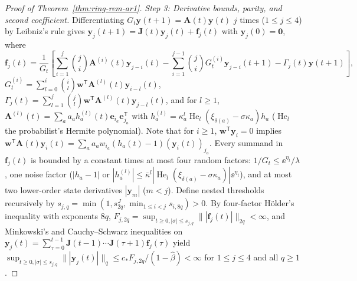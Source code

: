 \begin{proof}[Proof of Theorem~{\upshape\ref{thm:ring-rem-ar1}}]
\emph{Step 3: Derivative bounds, parity, and second coefficient.} Differentiating $G_t\mathbf{y}(t + 1) = \mathbf{A}(t)\mathbf{y}(t)$ $j$ times ($1 \le j \le 4$) by Leibniz's rule gives $\mathbf{y}_j(t + 1) = \mathbf{J}(t)\mathbf{y}_j(t) + \mathbf{f}_j(t)$ with $\mathbf{y}_j(0) = \mathbf{0}$, where
\[
\mathbf{f}_j(t) = \frac{1}{G_t}\left[\sum_{i=1}^j \binom{j}{i}\mathbf{A}^{(i)}(t)\mathbf{y}_{j-i}(t) - \sum_{i=1}^{j-1} \binom{j}{i} G_t^{(i)}\mathbf{y}_{j-i}(t + 1) - \Gamma_j(t)\mathbf{y}(t + 1)\right],
\]
$G_t^{(i)} = \sum_{l=0}^i \binom{i}{l}\mathbf{w}^{\mathsf{T}}\mathbf{A}^{(l)}(t)\mathbf{y}_{i-l}(t)$, $\Gamma_j(t) = \sum_{l=1}^j \binom{j}{l}\mathbf{w}^{\mathsf{T}}\mathbf{A}^{(l)}(t)\mathbf{y}_{j-l}(t)$, and for $l \ge 1$, $\mathbf{A}^{(l)}(t) = \sum_a a_a h_a^{(l)}(t)\mathbf{e}_{i_a}\mathbf{e}_{j_a}^{\mathsf{T}}$ with $h_a^{(l)} = \kappa_a^l\operatorname{He}_l(\xi_{\delta(a)} - \sigma\kappa_a)h_a$ ($\operatorname{He}_l$ the probabilist's Hermite polynomial). Note that for $i \ge 1$, $\mathbf{w}^{\mathsf{T}}\mathbf{y}_i = 0$ implies $\mathbf{w}^{\mathsf{T}}\mathbf{A}(t)\mathbf{y}_i(t) = \sum_a a_a w_{i_a}(h_a(t) - 1)(\mathbf{y}_i(t))_{j_a}$. Every summand in $\mathbf{f}_j(t)$ is bounded by a constant times at most four random factors: $1/G_t \le \ee^{\eta_t}/\lambda$, one noise factor ($|h_a - 1|$ or $|h_a^{(l)}| \le \bar{\kappa}^l|\operatorname{He}_l(\xi_{\delta(a)} - \sigma\kappa_a)|\ee^{\eta_t}$), and at most two lower-order state derivatives $|\mathbf{y}_m|$ ($m < j$). Define nested thresholds recursively by $s_{j,q} = \min(1, s_{2q}^J, \min_{1 \le i < j} s_{i,8q}) > 0$. By four-factor H\"older's inequality with exponents $8q$, $F_{j,2q} = \sup_{t \ge 0, |\sigma| \le s_{j,q}} \||\mathbf{f}_j(t)|\|_{2q} < \infty$, and Minkowski's and Cauchy--Schwarz inequalities on $\mathbf{y}_j(t) = \sum_{\tau=0}^{t-1} \mathbf{J}(t - 1)\cdots\mathbf{J}(\tau + 1)\mathbf{f}_j(\tau)$ yield $\sup_{t \ge 0, |\sigma| \le s_{j,q}} \||\mathbf{y}_j(t)|\|_q \le c_* F_{j,2q}/(1 - \hat{\beta}) < \infty$ for $1 \le j \le 4$ and all $q \ge 1$.


\end{proof}
